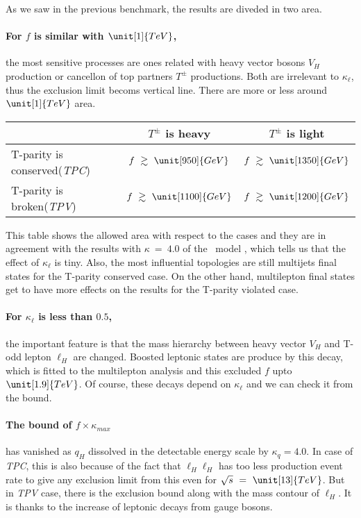 As we saw in the previous benchmark, the results are diveded in two area. 
\paragraph{For $f$ is similar with $\unit[1]{TeV}$,} the most sensitive processes are ones related with heavy vector bosons $V_H$ production or cancellon of top partners $T^\pm$ productions.
Both are irrelevant to $\kappa_\ell$, thus the exclusion limit becoms vertical line. There are more or less around $\unit[1]{TeV}$ area. 
 \begin{table}[h]
\begin{center}
  \begin{tabular}{ l | c | c }
    \hline
     & $T^\pm$ is heavy &  $T^\pm$ is light \\ \hline
    T-parity is conserved(\emph{TPC}) & $f~\gtrsim~\unit[950]{GeV}$ & $f~\gtrsim~\unit[1350]{GeV}$ \\ \hline
    T-parity is broken(\emph{TPV}) & $f~\gtrsim~\unit[1100]{GeV}$ & $f~\gtrsim~\unit[1200]{GeV}$ \\
    \hline
  \end{tabular}
\end{center}
 \end{table}

This table shows the allowed area with respect to the cases and they are in agreement with the results with $\kappa~=~4.0$ of the \fu~model
, which tells us that the effect of $\kappa_\ell$ is tiny. 
Also, the most influential topologies are still multijets final states for the T-parity conserved case. 
On the other hand, multilepton final states get to have more effects on the results for the T-parity violated case.


\paragraph{For $\kappa_\ell$ is less than $0.5$,} the important feature is that the mass hierarchy between heavy vector $V_H$ and T-odd lepton $\ell_H$ are changed.
Boosted leptonic states are produce by this decay, which is fitted to the multilepton analysis and this excluded $f$ upto $\unit[1.9]{TeV}$.
Of course, these decays depend on $\kappa_\ell$ and we can check it from the bound.

\paragraph{The bound of $f\times \kappa_{max}$} has vanished as $q_H$ dissolved in the detectable energy scale by $\kappa_q=4.0$.
In case of \emph{TPC}, this is also because of the fact that $\ell_H \ell_H$ has too less production event rate to give any exclusion limit from this even for $\sqrt{s}~=~\unit[13]{TeV}$.
But in \emph{TPV} case, there is the exclusion bound along with the mass contour of $\ell_H$. It is thanks to the increase of leptonic decays from gauge bosons. 
\bigskip

